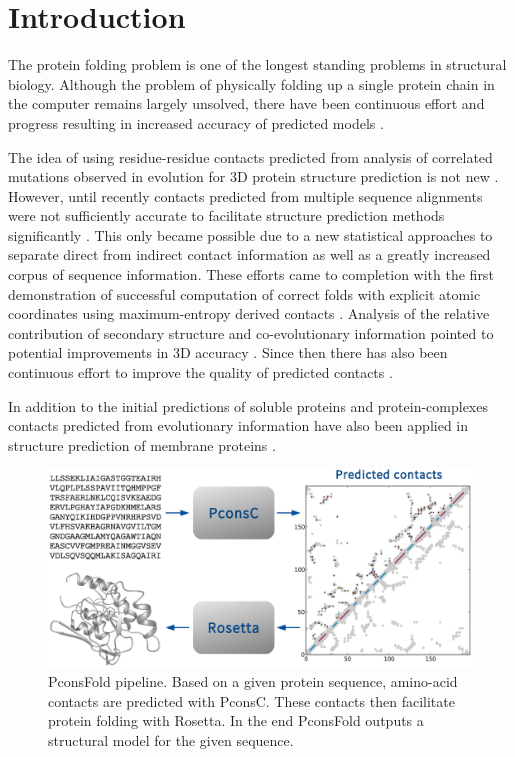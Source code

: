 \documentclass{bioinfo}
\begin{document}
\section{Introduction}
The protein folding problem is one of the
longest standing problems in structural biology. Although the problem
of physically folding up a single protein chain in the computer
remains largely unsolved, there have been continuous effort and
progress resulting in increased accuracy of predicted models
\cite[]{kryshtafovych_CASP10_2013}.

The idea of using residue-residue contacts predicted from analysis of
correlated mutations observed in evolution for 3D protein structure
prediction is not new
\cite[]{gobel_correlated_1994,Neher8278414,Hatrick16649265,Shindyalov_can_1994,Vendruscolo9377713}.
However, until recently contacts predicted from multiple sequence
alignments were not sufficiently accurate to facilitate structure
prediction methods significantly \cite[]{marks_protein_2012}.  This
only became possible due to a new statistical approaches to separate
direct from indirect contact information \cite[]{Lapedes1999,
  Lapedes2002, Weigt19116270,burger_disentangling_2010,
  morcos_direct-coupling_2011, marks_protein_2011} as well as a
greatly increased corpus of sequence information. These efforts came
to completion with the first demonstration of successful computation
of correct folds with explicit atomic coordinates using
maximum-entropy derived contacts \cite[]{marks_protein_2011}. Analysis
of the relative contribution of secondary structure and
co-evolutionary information pointed to potential improvements in 3D
accuracy \cite[]{Sulkowska22691493}. Since then there has also been
continuous effort to improve the quality of predicted contacts
\cite[]{jones_psicov:_2012, ekeberg_improved_2013,
  skwark_PconsC:_2013}.

In addition to the initial predictions of soluble proteins \cite[]{marks_protein_2011}
and protein-complexes \cite[]{Schug20018738}  contacts predicted from evolutionary information
have also been applied in structure prediction of membrane proteins
\cite[]{hopf_three-dimensional_2012, nugent_accurate_2012}.

\begin{figure}[!tpb]%
\centerline{\includegraphics[scale=0.35]{figures/pipeline.eps}}
\caption{PconsFold pipeline. Based on a given protein sequence,
  amino-acid contacts are predicted with PconsC. These contacts then
  facilitate protein folding with Rosetta. In the end PconsFold
  outputs a structural model for the given
  sequence.}\label{fig:pipeline} 
\end{figure}
\end{document}
